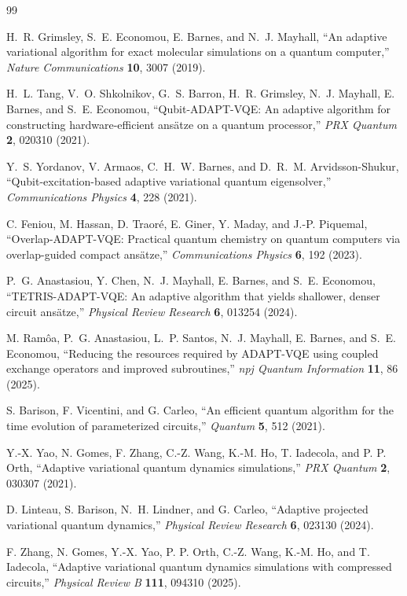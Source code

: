 \documentclass[
  reprint,
  amsmath,
  amssymb,
  aps,
  pra,
  nofootinbib,
  superscriptaddress,
  floatfix
]{revtex4-2}
\begin{document}
\begin{thebibliography}{99}

H.~R. Grimsley, S.~E. Economou, E. Barnes, and N.~J. Mayhall,
``An adaptive variational algorithm for exact molecular simulations on a quantum computer,''
\emph{Nature Communications} \textbf{10}, 3007 (2019).

H.~L. Tang, V.~O. Shkolnikov, G.~S. Barron, H.~R. Grimsley, N.~J. Mayhall, E. Barnes, and S.~E. Economou,
``Qubit-ADAPT-VQE: An adaptive algorithm for constructing hardware-efficient ans\"atze on a quantum processor,''
\emph{PRX Quantum} \textbf{2}, 020310 (2021).

Y.~S. Yordanov, V. Armaos, C.~H.~W. Barnes, and D.~R.~M. Arvidsson-Shukur,
``Qubit-excitation-based adaptive variational quantum eigensolver,''
\emph{Communications Physics} \textbf{4}, 228 (2021).

C. Feniou, M. Hassan, D. Traor\'e, E. Giner, Y. Maday, and J.-P. Piquemal,
``Overlap-ADAPT-VQE: Practical quantum chemistry on quantum computers via overlap-guided compact ans\"atze,''
\emph{Communications Physics} \textbf{6}, 192 (2023).

P.~G. Anastasiou, Y. Chen, N.~J. Mayhall, E. Barnes, and S.~E. Economou,
``TETRIS-ADAPT-VQE: An adaptive algorithm that yields shallower, denser circuit ans\"atze,''
\emph{Physical Review Research} \textbf{6}, 013254 (2024).

M. Ram\^oa, P.~G. Anastasiou, L.~P. Santos, N.~J. Mayhall, E. Barnes, and S.~E. Economou,
``Reducing the resources required by ADAPT-VQE using coupled exchange operators and improved subroutines,''
\emph{npj Quantum Information} \textbf{11}, 86 (2025).

S. Barison, F. Vicentini, and G. Carleo,
``An efficient quantum algorithm for the time evolution of parameterized circuits,''
\emph{Quantum} \textbf{5}, 512 (2021).

Y.-X. Yao, N. Gomes, F. Zhang, C.-Z. Wang, K.-M. Ho, T. Iadecola, and P. P. Orth,
``Adaptive variational quantum dynamics simulations,''
\emph{PRX Quantum} \textbf{2}, 030307 (2021).

D. Linteau, S. Barison, N.~H. Lindner, and G. Carleo,
``Adaptive projected variational quantum dynamics,''
\emph{Physical Review Research} \textbf{6}, 023130 (2024).

F. Zhang, N. Gomes, Y.-X. Yao, P. P. Orth, C.-Z. Wang, K.-M. Ho, and T. Iadecola,
``Adaptive variational quantum dynamics simulations with compressed circuits,''
\emph{Physical Review B} \textbf{111}, 094310 (2025).


\end{thebibliography}
\end{document}
